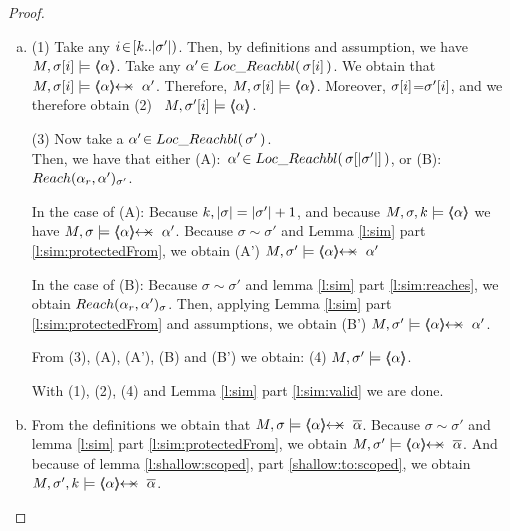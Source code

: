 \begin{proof} $~ $  %

\begin{enumerate} [a.]
\item
(1) Take any $i\!\in\![k..|\sigma'|)$. 
Then, by definitions  and assumption, we have   $M, {\sigma[i]} \models {\ensuremath{\langle\!\!\langle \alpha \rangle\!\!\rangle}}$. 
Take any $\alpha'\!\in\!\,Loc\_Reachbl(\,\sigma[i]\,)$. 
We obtain that $M, {\RestrictTo \sigma i} \models {\protectedFrom {\alpha} {\alpha'}}$. 
Therefore, $M, {\sigma[i]} \models {\ensuremath{\langle\!\!\langle \alpha \rangle\!\!\rangle}}$.
Moreover, ${\sigma[i]}$=${\sigma'[i]}$, and we therefore obtain (2) \ $M, {\sigma'[i]} \models {\ensuremath{\langle\!\!\langle \alpha \rangle\!\!\rangle}}$.

\vspace{.05cm} %

(3) Now take a  $\alpha'\!\in\!\,Loc\_Reachbl(\,\sigma'\,)$.\\
Then, we have that either (A):\ $\alpha'\!\in\!\,Loc\_Reachbl(\,\sigma[|\sigma'|]\,)$, or (B):\  $Reach(\alpha_r,\alpha')_{\sigma'}$. 

In the case of (A): Because $k,|\sigma| = |\sigma'| + 1$, and because $M,\sigma ,{k} \models {\ensuremath{\langle\!\!\langle \alpha \rangle\!\!\rangle}} $
we have  $M, \sigma \models {\protectedFrom {\alpha} {\alpha'}}$.
Because $\sigma \sim \sigma'$ and  Lemma \ref{l:sim} part \ref{l:sim:protectedFrom}, we obtain (A') $M, \sigma'   \models {\protectedFrom {\alpha} {\alpha'}}$ 
 
 In the case of (B): Because $\sigma \sim \sigma'$ and  lemma \ref{l:sim} part \ref{l:sim:reaches}, we obtain  $Reach(\alpha_r,\alpha')_{\sigma}$. 
 Then, applying Lemma \ref{l:sim} part \ref{l:sim:protectedFrom} and assumptions, we obtain (B') $M, \sigma'   \models {\protectedFrom {\alpha} {\alpha'}}$.
 
 From (3), (A), (A'), (B) and (B') we obtain: (4)  $M, \sigma'   \models {\ensuremath{\langle\!\!\langle \alpha \rangle\!\!\rangle}}$.
 
 \vspace{.05cm} %

 With (1), (2), (4) and Lemma \ref{l:sim} part \ref{l:sim:valid} we are done.
 \item
 From the definitions we obtain that $M, \sigma \models {\protectedFrom {\alpha} {\overline {\alpha}}}$.
 Because $\sigma \sim \sigma'$ and  lemma  \ref{l:sim} part \ref{l:sim:protectedFrom}, we obtain $M, \sigma' \models {\protectedFrom {\alpha} {\overline {\alpha}}}$.
 And because of lemma \ref{l:shallow:scoped}, part \ref{shallow:to:scoped},  we obtain $\satDAssertFrom M  {\sigma'} k   {\protectedFrom {\alpha}  {\overline \alpha}}$.
\end{enumerate}

\end{proof}


